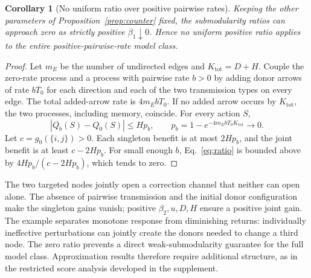 \documentclass[final,5p,times,twocolumn,sort&compress]{elsarticle}
\theoremstyle{plain}
\newtheorem{corollary}[theorem]{Corollary}
\begin{document}
\begin{corollary}[No uniform ratio over positive pairwise rates]
\label{cor:positivebeta}
Keeping the other parameters of Proposition~\ref{prop:counter} fixed, the submodularity ratios can approach zero as strictly positive $\beta_1\downarrow0$. Hence no uniform positive ratio applies to the entire positive-pairwise-rate model class.
\end{corollary}
\begin{proof}
Let $m_E$ be the number of undirected edges and $K_{\mathrm{tot}}=D+H$. Couple the zero-rate process and a process with pairwise rate $b>0$ by adding donor arrows of rate $bT_0$ for each direction and each of the two transmission types on every edge. The total added-arrow rate is $4m_EbT_0$. If no added arrow occurs by $K_{\mathrm{tot}}$, the two processes, including memory, coincide. For every action $S$,
\begin{equation}
 |Q_b(S)-Q_0(S)|\le H p_b,\qquad
 p_b=1-e^{-4m_EbT_0K_{\mathrm{tot}}}\longrightarrow0.\label{eq:continuity}
\end{equation}
Let $c=g_0(\{i,j\})>0$. Each singleton benefit is at most $2Hp_b$, and the joint benefit is at least $c-2Hp_b$. For small enough $b$, Eq.~\ref{eq:ratio} is bounded above by
$4Hp_b/(c-2Hp_b)$, which tends to zero.
\end{proof}

The two targeted nodes jointly open a correction channel that neither can open alone. The absence of pairwise transmission and the initial donor configuration make the singleton gains vanish; positive $\beta_2,u,D,H$ ensure a positive joint gain. The example separates monotone response from diminishing returns: individually ineffective perturbations can jointly create the donors needed to change a third node. The zero ratio prevents a direct weak-submodularity guarantee for the full model class. Approximation results therefore require additional structure, as in the restricted score analysis developed in the supplement.
\end{document}
